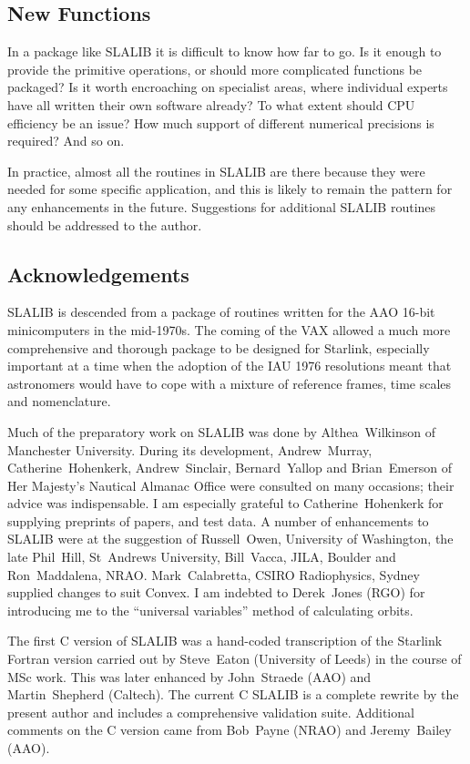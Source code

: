 \documentclass[11pt,twoside,nolof]{starlink}
\begin{document}
\subsection{New Functions}
In a package like SLALIB it is difficult to know how far to go.  Is it
enough to provide the primitive operations, or should more
complicated functions be packaged?  Is it worth encroaching on
specialist areas, where individual experts have all written their
own software already?  To what extent should CPU efficiency be
an issue?  How much support of different numerical precisions is
required?  And so on.

In practice, almost all the routines in SLALIB are there because they were
needed for some specific application, and this is likely to remain the
pattern for any enhancements in the future.
Suggestions for additional SLALIB routines should be addressed to the
author.

\subsection{Acknowledgements}
SLALIB is descended from a package of routines written
for the AAO 16-bit minicomputers
in the mid-1970s.  The coming of the VAX
allowed a much more comprehensive and thorough package
to be designed for Starlink, especially important
at a time when the adoption
of the IAU 1976 resolutions meant that astronomers
would have to cope with a mixture of reference frames,
time scales and nomenclature.

Much of the preparatory work on SLALIB was done by
Althea~Wilkinson of Manchester University.
During its development,
Andrew~Murray,
Catherine~Hohenkerk,
Andrew~Sinclair,
Bernard~Yallop
and
Brian~Emerson of Her Majesty's Nautical Almanac Office were consulted
on many occasions; their advice was indispensable.
I am especially grateful to
Catherine~Hohenkerk
for supplying preprints of papers, and test data. A number of
enhancements to SLALIB were at the suggestion of
Russell~Owen, University of Washington,
the late Phil~Hill, St~Andrews University,
Bill~Vacca, JILA, Boulder and
Ron~Maddalena, NRAO.
Mark~Calabretta, CSIRO Radiophysics, Sydney supplied changes to suit Convex.
I am indebted to Derek~Jones (RGO) for introducing me to the
``universal variables'' method of calculating orbits.

The first C version of SLALIB was a hand-coded transcription
of the Starlink Fortran version carried out by
Steve~Eaton (University of Leeds) in the course of
MSc work.  This was later
enhanced by John~Straede (AAO) and Martin~Shepherd (Caltech).
The current C SLALIB is a complete rewrite by the present author and
includes a comprehensive validation suite.
Additional comments on the C version came from Bob~Payne (NRAO) and
Jeremy~Bailey (AAO).
\end{document}
